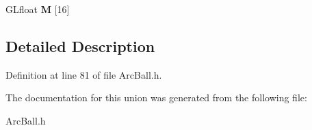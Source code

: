 \begin{DoxyCompactItemize}
\begin{tabbing}
\end{tabbing}\item 
G\-Lfloat {\bfseries M} [16]\label{unionMatrix4f__t_a21d5ccb7d244ef1d10740791e28f1405}

\end{DoxyCompactItemize}


\subsection{Detailed Description}


Definition at line 81 of file Arc\-Ball.\-h.



The documentation for this union was generated from the following file\-:\begin{DoxyCompactItemize}
\item 
Arc\-Ball.\-h\end{DoxyCompactItemize}
